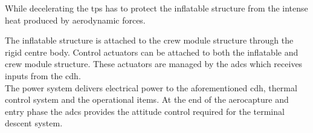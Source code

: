 While decelerating the \gls{tps} has to protect the inflatable structure from the intense heat produced by aerodynamic forces. %

The inflatable structure is attached to the crew module structure through the rigid centre body. Control actuators can be attached to both the inflatable and crew module structure. These actuators are managed by the \gls{adcs} which receives inputs from the \gls{cdh}.\\
The power system delivers electrical power to the aforementioned \gls{cdh}, thermal control system and the operational items. At the end of the aerocapture and entry phase the \gls{adcs} provides the attitude control required for the terminal descent system.